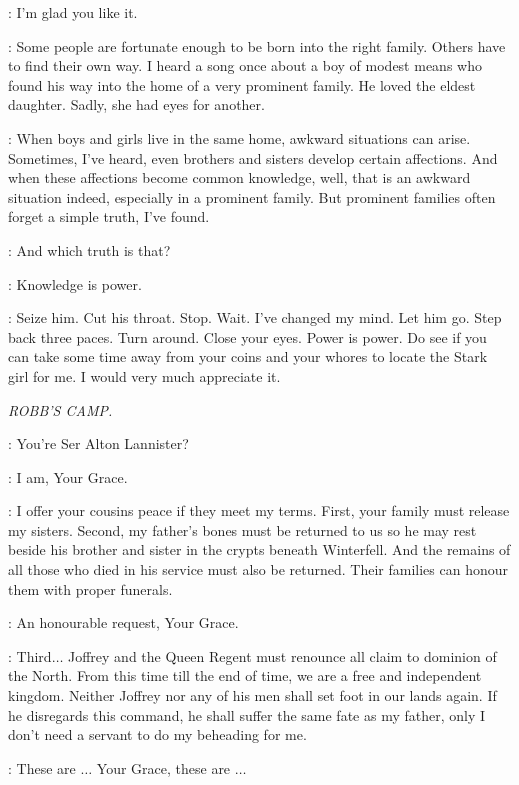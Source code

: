 \LITTLEFINGER: I'm glad you like it.

\CERSEI: Some people are fortunate enough to be born into the right family. Others have to find their own way. I heard a song once about a boy of modest means who found his way into the home of a very prominent family. He loved the eldest daughter. Sadly, she had eyes for another.

\LITTLEFINGER: When boys and girls live in the same home, awkward situations can arise. Sometimes, I've heard, even brothers and sisters develop certain affections. And when these affections become common knowledge, well, that is an awkward situation indeed, especially in a prominent family. But prominent families often forget a simple truth, I've found.

\CERSEI: And which truth is that?

\LITTLEFINGER: Knowledge is power.

\CERSEI: Seize him. Cut his throat. Stop. Wait. I've changed my mind. Let him go. Step back three paces. Turn around. Close your eyes. Power is power. Do see if you can take some time away from your coins and your whores to locate the Stark girl for me. I would very much appreciate it.


\scene

\textit{ROBB'S CAMP.}


\ROBB: You're Ser Alton Lannister?

\ALTON: I am, Your Grace.

\ROBB: I offer your cousins peace if they meet my terms. First, your family must release my sisters. Second, my father's bones must be returned to us so he may rest beside his brother and sister in the crypts beneath Winterfell. And the remains of all those who died in his service must also be returned. Their families can honour them with proper funerals.

\ALTON: An honourable request, Your Grace.

\ROBB: Third$\ldots$ Joffrey and the Queen Regent must renounce all claim to dominion of the North. From this time till the end of time, we are a free and independent kingdom. Neither Joffrey nor any of his men shall set foot in our lands again. If he disregards this command, he shall suffer the same fate as my father, only I don't need a servant to do my beheading for me.

\ALTON: These are $\ldots$ Your Grace, these are $\ldots$

